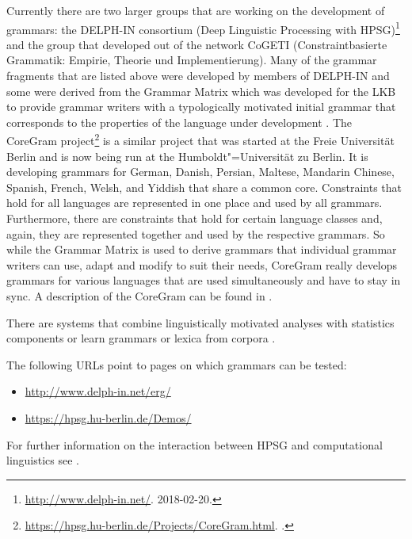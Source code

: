 \largerpage
Currently there are two larger groups that are working on the development of grammars: the DELPH-IN consortium (Deep Linguistic Processing with HPSG)\footnote{%
  \url{http://www.delph-in.net/}. 2018-02-20.
} and the group that developed out of the network CoGETI (Constraintbasierte Grammatik: Empirie, Theorie und
Implementierung).
Many of the grammar fragments that are listed above were developed by members of DELPH-IN and some
were derived from the Grammar Matrix which was developed for the LKB to provide
grammar writers with a typologically motivated initial grammar that corresponds to the properties of
the language under development \citep*{BFO2002a-u}. The CoreGram project\footnote{%
\url{https://hpsg.hu-berlin.de/Projects/CoreGram.html}. \mytoday.
} is a similar project that was started at the Freie Universität Berlin and is now being run
at the Humboldt"=Universität zu Berlin. It is developing grammars for German, Danish,
Persian, Maltese, Mandarin Chinese,
Spanish, French, Welsh, and Yiddish that share a common core. Constraints
that hold for all languages are represented in one place and used by all grammars. Furthermore, there are constraints that
hold for certain language classes and, again, they are represented together and used by the respective
grammars. So while the Grammar Matrix is used to derive grammars that individual grammar writers can use, adapt and modify to suit
their needs, CoreGram really develops grammars for various languages that are used simultaneously
and have to stay in sync. A description of the CoreGram can be found in .

There are systems that combine linguistically motivated analyses with statistics components
\citep{Brew95a,MNT2005a-u,MT2008a-u} or learn grammars or lexica from corpora \citep{Fouvry2003a-u,CZ2009a-u}. 

The following URLs point to pages on which grammars can be tested:
\begin{itemize}
\item \url{http://www.delph-in.net/erg/}
\item \url{https://hpsg.hu-berlin.de/Demos/}
\end{itemize}
For further information on the interaction between HPSG and computational linguistics see .

